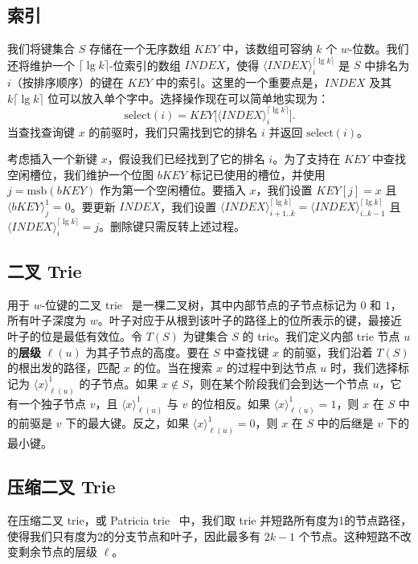 \documentclass[11pt,a4paper]{ctexart}
\newcommand{\tto}{\text{0}}
\newcommand{\ttl}{\text{1}}
\newcommand{\lpiece}[3]{\langle #1 \rangle_{#2}^{#3}}
\newcommand{\MSB}{\text{msb}}
\newcommand{\SELECT}{\text{select}}
\newcommand{\ceiling}[1]{\lceil #1 \rceil}
\begin{document}
\subsection{索引}

我们将键集合 $S$ 存储在一个无序数组 $KEY$ 中，该数组可容纳 $k$ 个 $w$-位数。我们还将维护一个 $\ceiling{\lg k}$-位索引的数组 $INDEX$，使得 $\lpiece{INDEX}{i}{\ceiling{\lg k}}$ 是 $S$ 中排名为 $i$（按排序顺序）的键在 $KEY$ 中的索引。这里的一个重要点是，$INDEX$ 及其 $k\ceiling{\lg k}$ 位可以放入单个字中。选择操作现在可以简单地实现为：
\[
\SELECT(i) = KEY\bigl[\lpiece{INDEX}{i}{\ceiling{\lg k}}\bigr].
\]
当查找查询键 $x$ 的前驱时，我们只需找到它的排名 $i$ 并返回 $\SELECT(i)$。

考虑插入一个新键 $x$，假设我们已经找到了它的排名 $i$。为了支持在 $KEY$ 中查找空闲槽位，我们维护一个位图 $bKEY$ 标记已使用的槽位，并使用 $j = \MSB(bKEY)$ 作为第一个空闲槽位。要插入 $x$，我们设置 $KEY[j] = x$ 且 $\lpiece{bKEY}{j}{1} = 0$。要更新 $INDEX$，我们设置 $\lpiece{INDEX}{i+1..k}{\ceiling{\lg k}} = \lpiece{INDEX}{i..k-1}{\ceiling{\lg k}}$ 且 $\lpiece{INDEX}{i}{\ceiling{\lg k}} = j$。删除键只需反转上述过程。

\subsection{二叉 Trie}

用于 $w$-位键的二叉 trie~\cite{fredkin60trie} 是一棵二叉树，其中内部节点的子节点标记为 $\tto$ 和 $\ttl$，所有叶子深度为 $w$。叶子对应于从根到该叶子的路径上的位所表示的键，最接近叶子的位是最低有效位。令 $T(S)$ 为键集合 $S$ 的 trie。我们定义内部 trie 节点 $u$ 的\textbf{层级} $\ell(u)$ 为其子节点的高度。要在 $S$ 中查找键 $x$ 的前驱，我们沿着 $T(S)$ 的根出发的路径，匹配 $x$ 的位。当在搜索 $x$ 的过程中到达节点 $u$ 时，我们选择标记为 $\lpiece{x}{\ell(u)}{1}$ 的子节点。如果 $x \notin S$，则在某个阶段我们会到达一个节点 $u$，它有一个独子节点 $v$，且 $\lpiece{x}{\ell(u)}{1}$ 与 $v$ 的位相反。如果 $\lpiece{x}{\ell(u)}{1} = 1$，则 $x$ 在 $S$ 中的前驱是 $v$ 下的最大键。反之，如果 $\lpiece{x}{\ell(u)}{1} = 0$，则 $x$ 在 $S$ 中的后继是 $v$ 下的最小键。

\subsection{压缩二叉 Trie}

在压缩二叉 trie，或 Patricia trie~\cite{morrison68patricia} 中，我们取 trie 并短路所有度为1的节点路径，使得我们只有度为2的分支节点和叶子，因此最多有 $2k-1$ 个节点。这种短路不改变剩余节点的层级 $\ell$。
\end{document}
